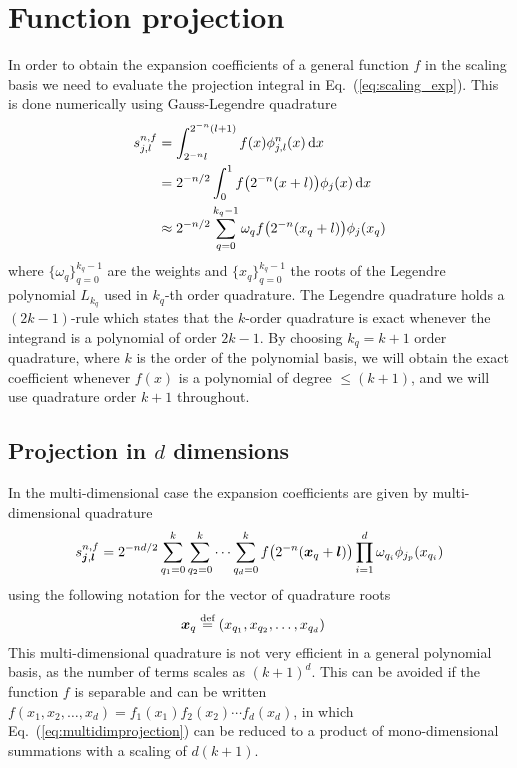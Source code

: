 \section{Function projection}\label{sec:impl_func_proj}
In order to obtain the expansion coefficients of a general function $f$ in the 
scaling basis we need to evaluate the projection integral in 
Eq.~(\ref{eq:scaling_exp}). This is done numerically using Gauss-Legendre quadrature
\begin{align}
    s_{j,l}^{n,f} 
	&= \int_{2^{-n}l}^{2^{-n}(l+1)} f(x)\phi_{j,l}^n(x)\,\mathrm{d} x\\
	&= 2^{-n/2}\int_0^1 f\big(2^{-n}(x+l)\big) \phi_j(x)\,\mathrm{d} x\\
	\label{eq:quadrature}
	&\approx 2^{-n/2}\sum_{q=0}^{k_q-1} \omega_q f\big(2^{-n}(x_q+l)\big) 
	    \phi_j(x_q)
\end{align}
where $\lbrace \omega_q\rbrace_{q=0}^{k_q-1}$ are the weights and
$\lbrace x_q\rbrace_{q=0}^{k_q-1}$ the roots of the Legendre polynomial $L_{k_q}$ 
used in $k_q$-th order quadrature. The Legendre quadrature holds a $(2k-1)$-rule 
which states that the $k$-order quadrature is exact whenever the integrand is a 
polynomial of order $2k-1$. By choosing $k_q = k+1$ order quadrature, where $k$ is
the order of the polynomial basis, we will obtain the exact coefficient
whenever $f(x)$ is a polynomial of degree $\leq (k+1)$, and we will use quadrature 
order $k+1$ throughout.

\subsection{Projection in $d$ dimensions}
In the multi-dimensional case the expansion coefficients are given by
multi-dimensional quadrature
\begin{equation}
    \label{eq:multidimprojection}
    s^{n,f}_{\boldsymbol j,\boldsymbol l} = 2^{-nd/2}
	\sum_{q_1=0}^{k}\sum_{q_2=0}^{k}\cdots\sum_{q_d=0}^{k}
        f\big(2^{-n}(\boldsymbol x_q+\boldsymbol l)\big)
	\prod_{i=1}^d \omega_{q_i}\phi_{j_p}(x_{q_i})
\end{equation}
using the following notation for the vector of quadrature roots
\begin{align}
    \boldsymbol x_q &\stackrel{\text{def}}{\hbox{=}} (x_{q_1},x_{q_2},\dots,x_{q_d})
\end{align}
This multi-dimensional quadrature is not very efficient in a general polynomial 
basis, as the number of terms scales as $(k+1)^d$. This can be avoided if the 
function $f$ is separable and can be written $f(x_1,x_2,\dots,x_d) = 
f_1(x_1)f_2(x_2)\cdots f_d(x_d)$, in which Eq.~(\ref{eq:multidimprojection}) can be 
reduced to a product of mono-dimensional summations with a scaling of $d(k+1)$.

